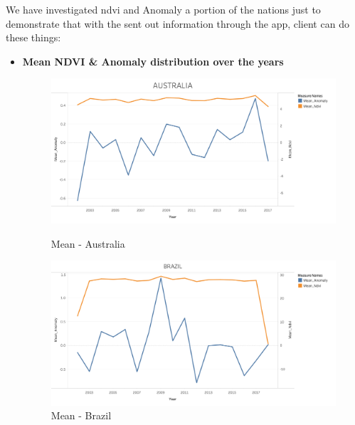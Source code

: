 We have investigated \gls{ndvi} and Anomaly a portion of the nations just to demonstrate that with the sent out information through the app, client can do these things:

\newpage

\begin{itemize}
    \item \textbf{Mean NDVI \& Anomaly distribution over the years}
    
    \begin{figure}[!htb]
        \begin{minipage}{0.5\textwidth}
            \centering
            \includegraphics[width=1.0\linewidth]{figures/ch5/Mean/AUSTRALIA_mean.png}
            \caption{Mean - Australia}\label{Fig:AUSTRALIA_mean}
        \end{minipage}\hfill
        \begin{minipage}{0.5\textwidth}
            \centering
            \includegraphics[width=1.0\linewidth]{figures/ch5/Mean/BRAZIL_mean.png}
            \caption{Mean - Brazil}\label{Fig:BRAZIL_mean}
        \end{minipage}
    \end{figure}
    

\end{itemize}
